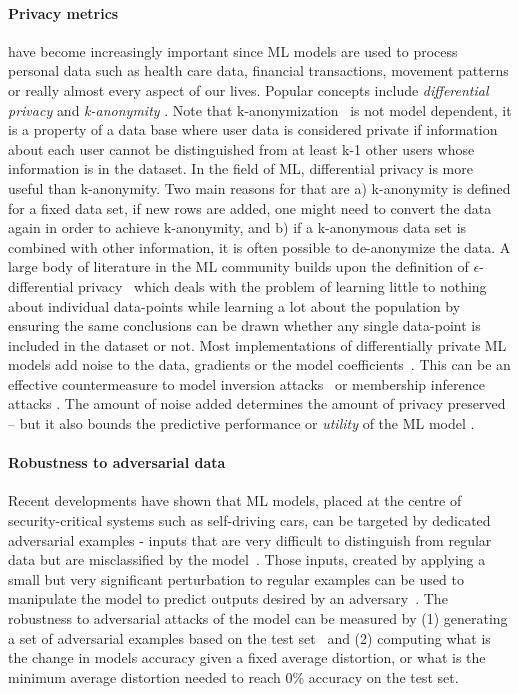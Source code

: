 \paragraph{Privacy metrics} have become increasingly important since ML models are used to process personal data such as health care data, financial transactions, movement patterns or really almost every aspect of our lives. Popular concepts include {\em differential privacy} \cite{Dworak_2006_diff} and {\em k-anonymity} \cite{Sweeney2002}. Note that k-anonymization~\cite{Sweeney2002} is not model dependent, it is a property of a data base where user data is considered private if information about each user cannot be distinguished from at least k-1 other users whose information is in the dataset.
In the field of ML, differential privacy is more useful than k-anonymity. Two main reasons for that are a) k-anonymity is defined for a fixed data set, if new rows are added, one might need to convert the data again in order to achieve k-anonymity, and b) if a k-anonymous data set is combined with other information, it is often possible to de-anonymize the data.
%
A large body of literature in the ML community builds upon the definition of $\epsilon$-differential privacy~\cite{Dworak2014differantial} which deals with the problem of learning little to nothing about individual data-points while learning a lot about the population by ensuring the same conclusions can be drawn whether any single data-point is included in the dataset or not. Most implementations of differentially private ML models add noise to the data, gradients or the model coefficients~\cite{Abadi2016, Shokri2017, papernot2016semisupervised, Mironov2017}. This can be an effective countermeasure to model inversion attacks~\cite{Fredrikson2015} or membership inference attacks \cite{Shokri2017}. The amount of noise added determines the amount of privacy preserved -- but it also bounds the predictive performance or {\em utility} of the ML model \cite{Jayaraman2019}.

\paragraph{Robustness to adversarial data} Recent developments have shown that ML models, placed at the centre of security-critical systems such as self-driving cars, can be targeted by dedicated adversarial examples - inputs that are very difficult to distinguish from regular data but are misclassified by the model~\cite{goodfellow2014explaining}. Those inputs, created by applying a small but very significant perturbation to regular examples can be used to manipulate the model to predict outputs desired by an adversary~\cite{szegedy2013intriguing, Biggio_2013, Nguyen_2015}. The robustness to adversarial attacks of the model can be measured by (1) generating a set of adversarial examples based on the test set~\cite{szegedy2013intriguing, Kurakin2017AdversarialEI, Hosseini2019AreOR, MoosaviDezfooli2016DeepFoolAS, goodfellow2014explaining} and (2) computing what is the change in models accuracy given a fixed average distortion, or what is the minimum average distortion needed to reach 0\% accuracy on the test set.


